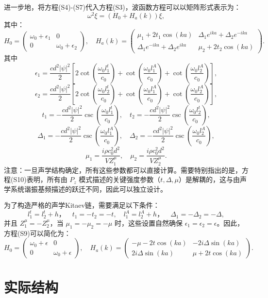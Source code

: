 进一步地，将方程(S4)-(S7)代入方程(S3)，波函数方程可以以矩阵形式表示为：
\[
\omega^2 \xi = (H_0 + H_a(k)) \xi, 
\]
其中：
\[
H_0 =
\begin{pmatrix}
\omega_0 + \epsilon_1 & 0 \\
0 & \omega_0 + \epsilon_2
\end{pmatrix},
\quad
H_a(k) =
\begin{pmatrix}
\mu_1 + 2t_1\cos(ka) & \Delta_1 e^{ika} + \Delta_2 e^{-ika} \\
\Delta_1 e^{-ika} + \Delta_2 e^{ika} & \mu_2 + 2t_2\cos(ka)
\end{pmatrix}. 
\]
其中
\[
\epsilon_1 = \frac{cd^2 |\psi|^2}{2} \left[ 2\cot\left(\frac{\omega_0 l_1^t}{c_0}\right) + \cot\left(\frac{\omega_0 l_1^A}{c_0}\right) + \cot\left(\frac{\omega_0 l_2^A}{c_0}\right) \right],
\]
\[
\epsilon_2 = \frac{cd^2 |\psi|^2}{2} \left[ 2\cot\left(\frac{\omega_0 l_2^t}{c_0}\right) + \cot\left(\frac{\omega_0 l_1^A}{c_0}\right) + \cot\left(\frac{\omega_0 l_2^A}{c_0}\right) \right],
\]
\[
t_1 = -\frac{cd^2 |\psi|^2}{2} \csc\left(\frac{\omega_0 l_1^t}{c_0}\right), \quad
t_2 = -\frac{cd^2 |\psi|^2}{2} \csc\left(\frac{\omega_0 l_2^t}{c_0}\right),
\]
\[
\Delta_1 = -\frac{cd^2 |\psi|^2}{2} \csc\left(\frac{\omega_0 l_1^A}{c_0}\right), \quad
\Delta_2 = -\frac{cd^2 |\psi|^2}{2} \csc\left(\frac{\omega_0 l_2^A}{c_0}\right),
\]
\[
\mu_1 = \frac{i\rho c_0^2 d^2}{V Z_1^\mu}, \quad
\mu_2 = \frac{i\rho c_0^2 d^2}{V Z_2^\mu}. 
\]
注意：一旦声学结构确定，所有这些参数都可以直接计算。需要特别指出的是，方程(S10)表明，所有由 \( P_z \) 模式描述的关键强度参数（\( t, \Delta, \mu \)）是解耦的，这与由声学系统谐振基频描述的跃迁不同，因此可以独立设计。

为了构造严格的声学Kitaev链，需要满足以下条件：
\[
l_1^t = l_2^t + h， \quad t_1 = -t_2 = -t, \quad
l_1^A = l_2^A + h，\quad \Delta_1 = -\Delta_2 = -\Delta,
\]
并且 \( Z_1^\mu = -Z_2^\mu \)，当 \( \mu_1 = -\mu_2 = -\mu \) 时，这些设置自然确保 \( \epsilon_1 = \epsilon_2 = \epsilon \)。因此，方程(S9)可以简化为：
\[
H_0 =
\begin{pmatrix}
\omega_0 + \epsilon & 0 \\
0 & \omega_0 + \epsilon
\end{pmatrix},
\quad
H_a(k) =
\begin{pmatrix}
-\mu - 2t\cos(ka) & -2i\Delta\sin(ka) \\
2i\Delta\sin(ka) & \mu + 2t\cos(ka)
\end{pmatrix}. 
\]

\section{实际结构}

